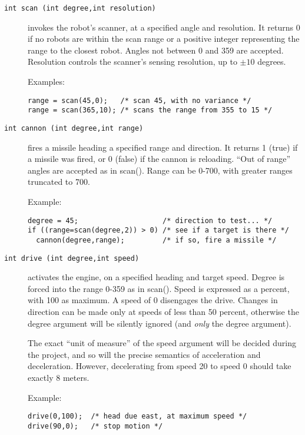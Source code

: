 \documentclass{article}
\begin{document}
\begin{description}
\item[\texttt{int scan (int degree,int resolution)}]
        invokes the robot's scanner, at a specified
        angle and resolution.  It returns 0 if no robots are
        within the scan range or a positive integer representing the
        range to the closest robot.  Angles not between 0 and 359 are accepted.
        Resolution controls the scanner's sensing resolution, up to
        $\pm 10$ degrees.

        Examples:
\begin{verbatim}
range = scan(45,0);   /* scan 45, with no variance */
range = scan(365,10); /* scans the range from 355 to 15 */
\end{verbatim}

\item[\texttt{int cannon (int degree,int range)}]
        fires a missile heading a specified range
        and direction.  It returns 1 (true) if a missile was fired,
        or 0 (false) if the cannon is reloading.  ``Out of range'' angles
        are accepted as in scan().  Range can be 0-700, with greater
        ranges truncated to 700.

        Example:
\begin{verbatim}
degree = 45;                    /* direction to test... */
if ((range=scan(degree,2)) > 0) /* see if a target is there */
  cannon(degree,range);         /* if so, fire a missile */
\end{verbatim}

\item[\texttt{int drive (int degree,int speed)}]
        activates the engine, on a 
        specified heading and target speed.  Degree is forced into the range
        0-359 as in scan().  Speed is expressed as a percent, with 100 as
        maximum.  A speed of 0 disengages the drive.  Changes in
        direction can be made only at speeds of less than 50 percent,
        otherwise the degree argument will be silently ignored (and \emph{only}
        the degree argument).

        The exact ``unit of measure'' of the speed argument will be
        decided during the project, and so will the precise semantics of
        acceleration and deceleration.  However, decelerating from speed
        20 to speed 0 should take exactly 8 meters.

        Example:
\begin{verbatim}
drive(0,100);  /* head due east, at maximum speed */
drive(90,0);   /* stop motion */
\end{verbatim}


\end{description}
\end{document}
